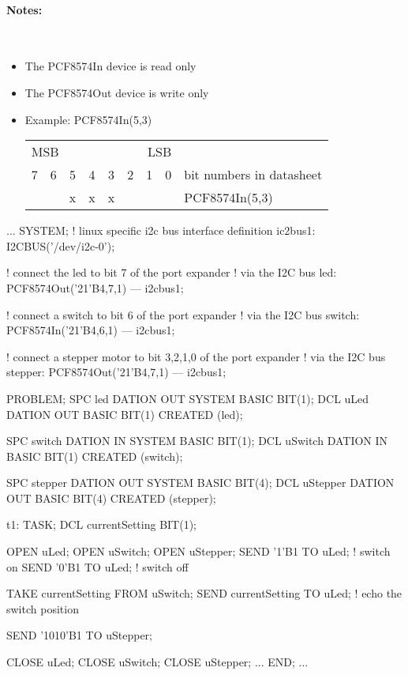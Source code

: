 \paragraph{Notes:}\ 
\begin{itemize}
\item The PCF8574In device is read only
\item The PCF8574Out device is write only
\item Example: PCF8574In(5,3)  
\newline
\begin{tabular}{|c|c|c|c|c|c|c|c|l}

 \multicolumn{4}{l}{MSB}&\multicolumn{4}{r}{LSB}&\\
\cline{1-8}
 7 & 6 & 5 & 4 & 3 & 2 & 1 & 0 & bit numbers in datasheet\\
\cline{1-8}
   &   & x & x & x &   &   &   & PCF8574In(5,3) \\
\cline{1-8}
\end{tabular}

\end{itemize}

\begin{PEARLCode}
...
SYSTEM;
   ! linux specific i2c bus interface definition
   ic2bus1: I2CBUS('/dev/i2c-0');

   ! connect the led to bit 7 of the port expander
   ! via the I2C bus
   led: PCF8574Out('21'B4,7,1) --- i2cbus1;

   ! connect a switch to bit 6 of the port expander
   ! via the I2C bus
   switch: PCF8574In('21'B4,6,1) --- i2cbus1;

   ! connect a stepper motor to bit 3,2,1,0 of the port expander
   ! via the I2C bus
   stepper: PCF8574Out('21'B4,7,1) --- i2cbus1;

PROBLEM;
   SPC led DATION OUT SYSTEM BASIC BIT(1);
   DCL uLed DATION OUT BASIC BIT(1) CREATED (led);

   SPC switch DATION IN SYSTEM BASIC BIT(1);
   DCL uSwitch DATION IN BASIC BIT(1) CREATED (switch);

   SPC stepper DATION OUT SYSTEM BASIC BIT(4);
   DCL uStepper DATION OUT BASIC BIT(4) CREATED (stepper);

t1: TASK;
   DCL currentSetting BIT(1);

   OPEN uLed;
   OPEN uSwitch;
   OPEN uStepper;
   SEND '1'B1 TO uLed;  ! switch on
   SEND '0'B1 TO uLed;  ! switch off

   TAKE currentSetting FROM uSwitch;
   SEND currentSetting TO uLed;  ! echo the switch position

   SEND '1010'B1 TO uStepper;
 
   CLOSE uLed;
   CLOSE uSwitch;
   CLOSE uStepper;
...
END;
...
\end{PEARLCode}

